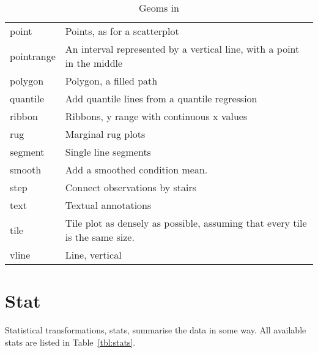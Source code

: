 \begin{table}
\begin{center}
\begin{tabular}{lp{3in}}
      point        & Points, as for a scatterplot                                                 \\
      pointrange   & An interval represented by a vertical line, with a point in the middle       \\
      polygon      & Polygon, a filled path                                                       \\
      quantile     & Add quantile lines from a quantile regression                                \\
      ribbon       & Ribbons, y range with continuous x values                                    \\
      rug          & Marginal rug plots                                                           \\
      segment      & Single line segments                                                         \\
      smooth       & Add a smoothed condition mean.                                               \\
      step         & Connect observations by stairs                                               \\
      text         & Textual annotations                                                          \\
      tile         & Tile plot as densely as possible, assuming that every tile is the same size. \\
      vline        & Line, vertical                                                               \\
  
      \bottomrule
  \end{tabular}
  \end{center}
  \caption{Geoms in \ggplot}
  \label{tbl:geoms}
\end{table}


\section{Stat}
\label{sec:stat}

Statistical transformations, stats, summarise the data in some way.  All available stats are listed in Table~\ref{tbl:stats}. 

